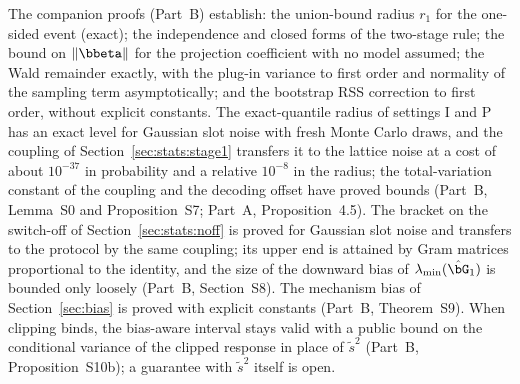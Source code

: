 The companion proofs (Part~B) establish: the union-bound radius $r_1$ for the one-sided event (exact); the independence and closed forms of the two-stage rule; the bound on $\|\bbeta\|$ for the projection coefficient with no model assumed; the Wald remainder exactly, with the plug-in variance to first order and normality of the sampling term asymptotically; and the bootstrap RSS correction to first order, without explicit constants. The exact-quantile radius of settings I and P has an exact level for Gaussian slot noise with fresh Monte Carlo draws, and the coupling of Section~\ref{sec:stats:stage1} transfers it to the lattice noise at a cost of about $10^{-37}$ in probability and a relative $10^{-8}$ in the radius; the total-variation constant of the coupling and the decoding offset have proved bounds (Part~B, Lemma~S0 and Proposition~S7; Part~A, Proposition~4.5). The bracket on the switch-off of Section~\ref{sec:stats:noff} is proved for Gaussian slot noise and transfers to the protocol by the same coupling; its upper end is attained by Gram matrices proportional to the identity, and the size of the downward bias of $\lambda_{\min}(\hat\bG_1)$ is bounded only loosely (Part~B, Section~S8). The mechanism bias of Section~\ref{sec:bias} is proved with explicit constants (Part~B, Theorem~S9). When clipping binds, the bias-aware interval stays valid with a public bound on the conditional variance of the clipped response in place of $\tilde s^2$ (Part~B, Proposition~S10b); a guarantee with $\tilde s^2$ itself is open.

